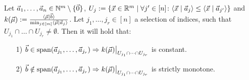 \begin{lemma}
    \label{lemma:k_behavior}
    Let $\vec a_1, \dots, \vec a_n \in \mathbb{N}^m \setminus \{\vec0\}$, $U_j := \{\vec x \in \mathbb{R}^m \mid \forall j' \in [n]\colon \langle \vec x \mid \vec a_j \rangle \leq \langle \vec x \mid \vec a_{j'} \rangle\}$ and $k(\vec \mu) := \frac{\langle \vec{\mu} \mid \vec b \rangle}{\min_{j \in [m]} \langle \vec \mu \mid \vec a_j \rangle}$. Let $j_1, \dots, j_r \in [n]$ a selection of indices, such that $U_{j_1} \cap \dots \cap U_{j_r} \neq \emptyset$.  Then it will hold that:
    \begin{itemize}
        \item[1)] $\vec b \in \Span(\vec a_{j_1}, \dots, \vec a_{j_r}) \Rightarrow \restrict{k(\vec \mu)}{U_{j_1} \cap \dots \cap U_{j_r}}$ is constant.
        \item[2)] $\vec b \notin \Span(\vec a_{j_1}, \dots, \vec a_{j_r}) \Rightarrow \restrict{k(\vec \mu)}{U_{j_1} \cap \dots \cap U_{j_r}}$ is strictly monotone.
    \end{itemize}
\end{lemma}
